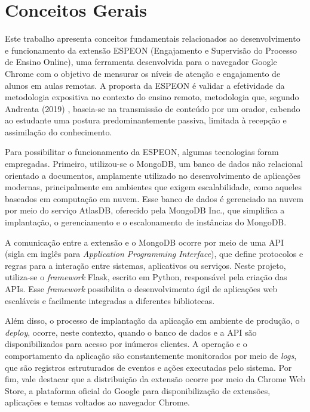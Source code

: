 \section{Conceitos Gerais}\label{sec:concepts}
Este trabalho apresenta conceitos fundamentais relacionados ao desenvolvimento e funcionamento da extensão ESPEON (Engajamento e Supervisão do Processo de Ensino Online), uma ferramenta desenvolvida para o navegador Google Chrome com o objetivo de mensurar os níveis de atenção e engajamento de alunos em aulas remotas. A proposta da ESPEON é validar a efetividade da metodologia expositiva no contexto do ensino remoto, metodologia que, segundo Andreata (2019) \cite{ANDREATA2019}, baseia-se na transmissão de conteúdo por um orador, cabendo ao estudante uma postura predominantemente passiva, limitada à recepção e assimilação do conhecimento.

Para possibilitar o funcionamento da ESPEON, algumas tecnologias foram empregadas. Primeiro, utilizou-se o MongoDB, um banco de dados não relacional orientado a documentos, amplamente utilizado no desenvolvimento de aplicações modernas, principalmente em ambientes que exigem escalabilidade, como aqueles baseados em computação em nuvem. Esse banco de dados é gerenciado na nuvem por meio do serviço AtlasDB, oferecido pela MongoDB Inc., que simplifica a implantação, o gerenciamento e o escalonamento de instâncias do MongoDB.

A comunicação entre a extensão e o MongoDB ocorre por meio de uma API (sigla em inglês para \textit{Application Programming Interface}), que define protocolos e regras para a interação entre sistemas, aplicativos ou serviços. Neste projeto, utiliza-se o \textit{framework} Flask, escrito em Python, responsável pela criação das APIs. Esse \textit{framework} possibilita o desenvolvimento ágil de aplicações web escaláveis e facilmente integradas a diferentes bibliotecas.

Além disso, o processo de implantação da aplicação em ambiente de produção, o \textit{deploy}, ocorre, neste contexto, quando o banco de dados e a API são disponibilizados para acesso por inúmeros clientes. A operação e o comportamento da aplicação são constantemente monitorados por meio de \textit{logs}, que são registros estruturados de eventos e ações executadas pelo sistema. Por fim, vale destacar que a distribuição da extensão ocorre por meio da Chrome Web Store, a plataforma oficial do Google para disponibilização de extensões, aplicações e temas voltados ao navegador Chrome.